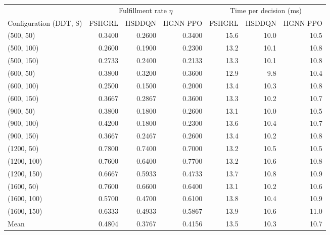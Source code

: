 \begin{tabular}{lrrrrrr}
\toprule
 & \multicolumn{3}{c}{Fulfillment rate $\eta$} & \multicolumn{3}{c}{Time per decision (ms)} \\
\cmidrule(lr){2-4}\cmidrule(lr){5-7}
Configuration (DDT, S) & FSHGRL & HSDDQN & HGNN-PPO & FSHGRL & HSDDQN & HGNN-PPO \\
\midrule
(500, 50) & 0.3400 & 0.2600 & 0.3400 & 15.6 & 10.0 & 10.5 \\
(500, 100) & 0.2600 & 0.1900 & 0.2300 & 13.2 & 10.1 & 10.8 \\
(500, 150) & 0.2733 & 0.2400 & 0.2133 & 13.3 & 10.1 & 10.8 \\
(600, 50) & 0.3800 & 0.3200 & 0.3600 & 12.9 & 9.8 & 10.4 \\
(600, 100) & 0.2500 & 0.1500 & 0.2000 & 13.4 & 10.3 & 10.8 \\
(600, 150) & 0.3667 & 0.2867 & 0.3600 & 13.3 & 10.2 & 10.7 \\
(900, 50) & 0.3800 & 0.1800 & 0.2600 & 13.1 & 10.0 & 10.5 \\
(900, 100) & 0.4200 & 0.1800 & 0.2300 & 13.6 & 10.4 & 10.7 \\
(900, 150) & 0.3667 & 0.2467 & 0.2600 & 13.4 & 10.2 & 10.8 \\
(1200, 50) & 0.7800 & 0.7400 & 0.7000 & 13.2 & 10.5 & 10.5 \\
(1200, 100) & 0.7600 & 0.6400 & 0.7700 & 13.2 & 10.6 & 10.8 \\
(1200, 150) & 0.6667 & 0.5933 & 0.4733 & 13.7 & 10.8 & 10.9 \\
(1600, 50) & 0.7600 & 0.6600 & 0.6400 & 13.1 & 10.2 & 10.6 \\
(1600, 100) & 0.5700 & 0.4700 & 0.6100 & 13.8 & 10.4 & 10.9 \\
(1600, 150) & 0.6333 & 0.4933 & 0.5867 & 13.9 & 10.6 & 11.0 \\
Mean & 0.4804 & 0.3767 & 0.4156 & 13.5 & 10.3 & 10.7 \\
\bottomrule
\end{tabular}
